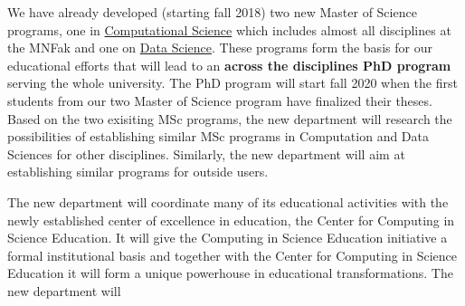\documentclass[oneside,final,10pt]{article}
\begin{document}
We have already developed (starting fall 2018) two new Master of
Science programs, one in \href{{http://www.uio.no/english/studies/programmes/computational-science-master/index.html}}{Computational Science} which includes almost all
disciplines at the MNFak and one on \href{{http://www.uio.no/english/studies/programmes/datascience-master/index.html}}{Data Science}.  These
programs form the basis for our educational efforts that will lead to
an \textbf{across the disciplines PhD program} serving the whole
university. The PhD program will start fall 2020 when the first
students from our two Master of Science program have finalized their
theses.  Based on the two exisiting MSc programs, the new department will research the possibilities of establishing similar MSc programs in Computation and Data Sciences for other disciplines.  Similarly, the new department will aim at establishing similar programs for outside users.  

The new department will coordinate many of its educational
activities with the newly established center of excellence in
education, the Center for Computing in Science Education. It will give
the Computing in Science Education initiative a formal institutional
basis  and together with the Center for Computing in Science Education it
will form a unique powerhouse in educational transformations. The new
department will
\end{document}
